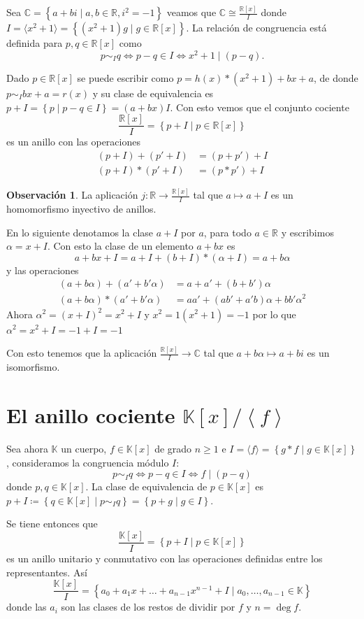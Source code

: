 \documentclass[10pt, spanish]{report}
\theoremstyle{definition}
\newtheorem*{obs}{Observación}
\newcommand{\R}{\mathbb{R}}
\newcommand{\C}{\mathbb{C}}
\newcommand{\K}{\mathbb{K}}
\renewcommand{\geq}{\geqslant}
\begin{document}
Sea $\C =\left\{ a+bi\mid a,b\in\R, i^2 = -1 \right\}$ veamos que $\C\cong
\frac{\R[x]}{I}$ donde $I=\langle x^2 +1\rangle=\left\{(x^2+1)g\mid g\in\R[x]
\right\}$. La relación de congruencia está definida para $p,q\in\R[x]$ como
\[p\sim_I q \Leftrightarrow p-q\in I\Leftrightarrow x^2+1\mid(p-q).\]

Dado $p\in\R[x]$ se puede escribir como $p=h(x)*(x^2+1)+bx+a$, de donde
$p\sim_I bx+a=r(x)$ y su clase de equivalencia es $p+I=\left\{ p\mid p-q\in
I\right\}=(a+bx)I$. Con esto vemos que el conjunto cociente
\[\frac{\R[x]}{I}=\left\{ p+I\mid p\in\R[x] \right\} \]
es un anillo con las operaciones
\begin{align*}
    (p+I)+(p'+I)&=(p+p')+I\\
    (p+I)*(p'+I)&=(p*p')+I
\end{align*}

\begin{obs}
    La aplicación $j:\R\to\frac{\R[x]}{I}$ tal que $a\mapsto a+I$ es un
    homomorfismo inyectivo de anillos.
\end{obs}

En lo siguiente denotamos la clase $a+I$ por $a$, para todo $a\in\R$ y
escribimos $\alpha = x+I$. Con esto la clase de un elemento $a+bx$ es
\[a+bx+I=a+I+(b+I)*(\alpha+I)=a+b\alpha\]
y las operaciones
\begin{align*}
    (a+b\alpha)+(a'+b'\alpha)&=a+a'+(b+b')\alpha\\
    (a+b\alpha)*(a'+b'\alpha)&=aa'+(ab'+a'b)\alpha+bb'\alpha^2
\end{align*}
Ahora $\alpha^2=(x+I)^2=x^2+I$ y $x^2=1(x^2+1)=-1$ por lo que $\alpha^2=x^2+I
=-1+I=-1$

Con esto tenemos que la aplicación $\frac{\R[x]}{I}\to \C$ tal que
$a+b\alpha\mapsto a+bi$ es un isomorfismo.

\section{El anillo cociente $\K[x]/\left<f\right>$}

Sea ahora $\K$ un cuerpo, $f\in\K[x]$ de grado $n\geq 1$ e $I=\langle f\rangle=
\left\{ g*f\mid g\in\K[x] \right\}$, consideramos la congruencia módulo $I$:
\[p\sim_I q\Leftrightarrow p-q\in I \Leftrightarrow f\mid(p-q)\]
donde $p,q\in\K[x]$. La clase de equivalencia de $p\in\K[x]$ es $p+I\coloneqq
\left\{q\in\K[x]\mid p\sim_Iq\right\}=\left\{p+g\mid g\in I\right\}$.

Se tiene entonces que \[\frac{\K[x]}{I}=\left\{ p+I\mid p\in\K[x] \right\}\] es
un anillo unitario y conmutativo con las operaciones definidas entre los
representantes. Así \[\frac{\K[x]}{I}=\left\{ a_0+a_1x+\ldots+a_{n-1}x^{n-1}+
I\mid a_0,\ldots,a_{n-1}\in\K \right\}\] donde las $a_i$ son las clases de los
restos de dividir por $f$ y $n=\deg{f}$.
\end{document}

